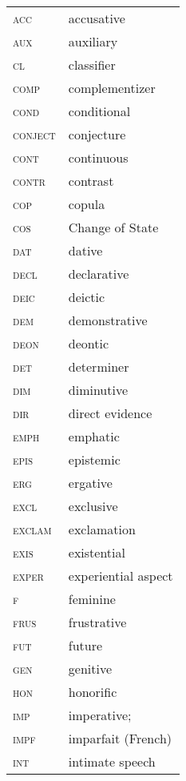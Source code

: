 
\begin{tabularx}{.5\textwidth}{@{}>{\scshape}lQ} 
acc & accusative\\
aux & auxiliary\\
cl & classifier\\
comp & complementizer\\
cond & conditional\\
conject & conjecture\\
cont & continuous\\
contr & contrast\\
cop & copula\\
cos & Change of State\\
dat & dative\\
decl & declarative\\
deic & deictic\\
dem & demonstrative\\
deon & deontic\\
det & determiner\\
dim & diminutive\\
dir & direct evidence\\
emph & emphatic\\
epis & epistemic\\
erg & ergative\\
excl & exclusive\\
exclam & exclamation\\
exis & existential\\
exper & experiential aspect\\
f & feminine\\
frus & frustrative\\
fut & future\\
gen & genitive\\
hon & honorific\\
imp &  imperative; \\
impf & imparfait (French)\\
int & intimate speech\\
\end{tabularx}%
